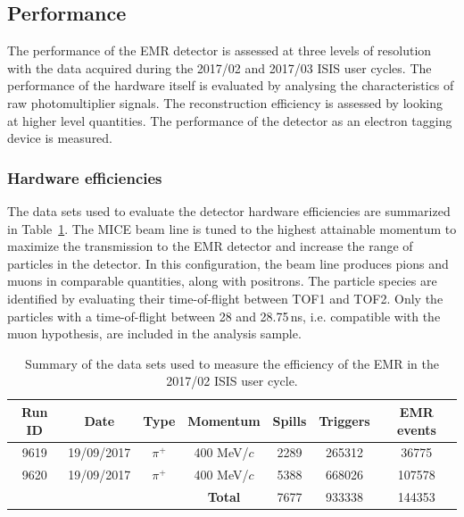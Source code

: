 \subsection{Performance}
\label{SubSect:EMR_Performance}

The performance of the EMR detector is assessed at three levels of resolution with the data acquired during the 2017/02 and 2017/03 ISIS user cycles. The performance of the hardware itself is evaluated by analysing the characteristics of raw photomultiplier signals. The reconstruction efficiency is assessed by looking at higher level quantities. The performance of the detector as an electron tagging device is measured.

\subsubsection{Hardware efficiencies}
The data sets used to evaluate the detector hardware efficiencies are summarized in Table~\ref{tab:emr_eff_data_sets}. The MICE beam line is tuned to the highest attainable momentum to maximize the transmission to the EMR detector and increase the range of particles in the detector. In this configuration, the beam line produces pions and muons in comparable quantities, along with positrons. The particle species are identified by evaluating their time-of-flight between TOF1 and TOF2.
Only the particles with a time-of-flight between 28 and 28.75\,ns, i.e. compatible with the muon hypothesis, are included in the analysis sample.

\begin{table}[htb!]
	\centering
	\begin{tabular}{c|c|c|c|c|c|c}
		Run ID & Date & Type & Momentum & Spills & Triggers & EMR events \\
		\hline
		9619 & 19/09/2017 & $\pi^+$ & 400 MeV/$c$ & 2289 & 265312 & 36775 \\
		9620 & 19/09/2017 & $\pi^+$ & 400 MeV/$c$ & 5388 & 668026 & 107578 \\
		\hline
		\multicolumn{3}{c}{} & \textbf{Total} & 7677 & 933338 & 144353
	\end{tabular}
	\caption{Summary of the data sets used to measure the efficiency of the EMR in the 2017/02 ISIS user cycle.}
	\label{tab:emr_eff_data_sets}
\end{table}

